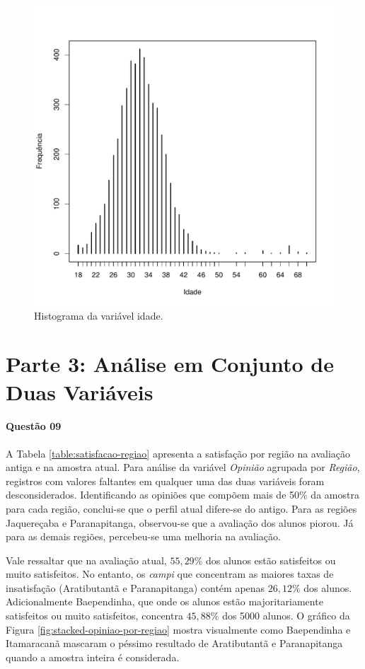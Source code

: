 \documentclass[10pt,a4paper,oneside]{article}
\newcommand{\arat}{Aratibutantã\xspace}
\newcommand{\baep}{Baependinha\xspace}
\newcommand{\itam}{Itamaracanã\xspace}
\newcommand{\jaqu}{Jaquereçaba\xspace}
\newcommand{\para}{Paranapitanga\xspace}
\begin{document}
\begin{figure}[h]
\begin{minipage}{0.46\textwidth}
	\includegraphics[width=\linewidth]{plots/histograma-idade}
	\caption{Histograma da variável idade. }
	\label{figure: histograma idade}
\end{minipage}
\end{figure}

\section*{Parte 3: Análise em Conjunto de Duas Variáveis}

\paragraph{Questão 09}

A Tabela \ref{table:satisfacao-regiao} apresenta a satisfação por região na avaliação antiga e na amostra atual. Para análise da variável \textit{Opinião} agrupada por \textit{Região}, registros com valores faltantes em qualquer uma das duas variáveis foram desconsiderados. Identificando as opiniões que compõem mais de 50\% da amostra para cada região, conclui-se que o perfil atual difere-se do antigo. Para as regiões \jaqu e \para, observou-se que a avaliação dos alunos piorou. Já para as demais regiões, percebeu-se uma melhoria na avaliação. 

Vale ressaltar que na avaliação atual, $55,29\%$ dos alunos estão satisfeitos ou muito satisfeitos. No entanto, os \textit{campi} que concentram as maiores taxas de insatisfação (\arat e \para) contém apenas $26,12\%$ dos alunos. Adicionalmente \baep, que onde os alunos estão majoritariamente satisfeitos ou muito satisfeitos, concentra $45,88\%$ dos 5000 alunos. O gráfico da Figura \ref{fig:stacked-opiniao-por-regiao} mostra visualmente como \baep e \itam mascaram o péssimo resultado de \arat e \para quando a amostra inteira é considerada.
\end{document}
